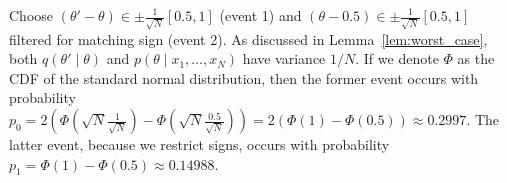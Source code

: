 \documentclass[twoside]{article} \usepackage{aistats2017}
\begin{document}

Choose $(\theta' - \theta) \in \pm\frac{1}{\sqrt{N}}[0.5,1]$ (event 1) and $(\theta -0.5)
\in \pm\frac{1}{\sqrt{N}}[0.5,1]$ filtered for  matching sign (event 2).  As
discussed in Lemma~\ref{lem:worst_case}, both $q(\theta' \mid \theta)$ and
$p(\theta \mid x_1,\ldots,x_N)$ have variance $1/N$. If we denote $\Phi$ as the
CDF of the standard normal distribution, then the former event occurs with
probability $p_0 = 2(\Phi(\sqrt{N}\frac{1}{\sqrt{N}}) -
\Phi(\sqrt{N}\frac{0.5}{\sqrt{N}})) = 2(\Phi(1)-\Phi(0.5)) \approx 0.2997$. The
latter event, because we restrict signs, occurs with probability $p_1 =
\Phi(1) - \Phi(0.5) \approx 0.14988$. 
\end{document}

